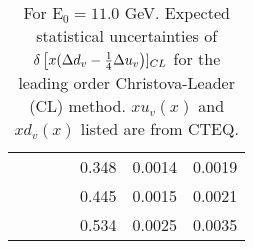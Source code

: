 \begin{table}[htbp]
\begin{center}
\begin{tabular}{|ccccc||c|c|}
         &          &          &          &    0.348 &    0.0014 &    0.0019 \\
         &          &          &          &    0.445 &    0.0015 &    0.0021 \\
         &          &          &          &    0.534 &    0.0025 &    0.0035 \\
\hline
\end{tabular}
\end{center}
\caption{\label{tab:ddv1}  For E$_0=11.0 $ GeV. 
Expected statistical uncertainties of  $\delta \left[x( \Delta d_v -{1 \over 4} \Delta u_v \right)]_{CL}$
for the leading order Christova-Leader (CL) method. $x u_v(x)$ and $x d_v(x)$ listed are from CTEQ.
}
\end{table}
%
%
%
%
